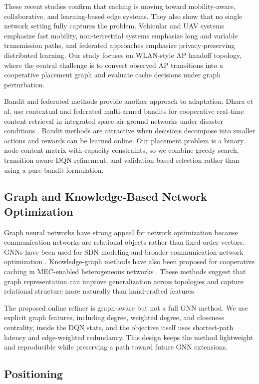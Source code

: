 These recent studies confirm that caching is moving toward mobility-aware, collaborative, and learning-based edge systems. They also show that no single network setting fully captures the problem. Vehicular and UAV systems emphasize fast mobility, non-terrestrial systems emphasize long and variable transmission paths, and federated approaches emphasize privacy-preserving distributed learning. Our study focuses on WLAN-style AP handoff topology, where the central challenge is to convert observed AP transitions into a cooperative placement graph and evaluate cache decisions under graph perturbation.

Bandit and federated methods provide another approach to adaptation. Dhara et al. use contextual and federated multi-armed bandits for cooperative real-time content retrieval in integrated space-air-ground networks under disaster conditions \cite{dhara2026co}. Bandit methods are attractive when decisions decompose into smaller actions and rewards can be learned online. Our placement problem is a binary node-content matrix with capacity constraints, so we combine greedy search, transition-aware DQN refinement, and validation-based selection rather than using a pure bandit formulation.

\subsection{Graph and Knowledge-Based Network Optimization}

Graph neural networks have strong appeal for network optimization because communication networks are relational objects rather than fixed-order vectors. GNNs have been used for SDN modeling and broader communication-network optimization \cite{Rusek2019,Jiang2022Survey}. Knowledge-graph methods have also been proposed for cooperative caching in MEC-enabled heterogeneous networks \cite{wang2024knowledge}. These methods suggest that graph representation can improve generalization across topologies and capture relational structure more naturally than hand-crafted features.

The proposed online refiner is graph-aware but not a full GNN method. We use explicit graph features, including degree, weighted degree, and closeness centrality, inside the DQN state, and the objective itself uses shortest-path latency and edge-weighted redundancy. This design keeps the method lightweight and reproducible while preserving a path toward future GNN extensions.

\subsection{Positioning}

